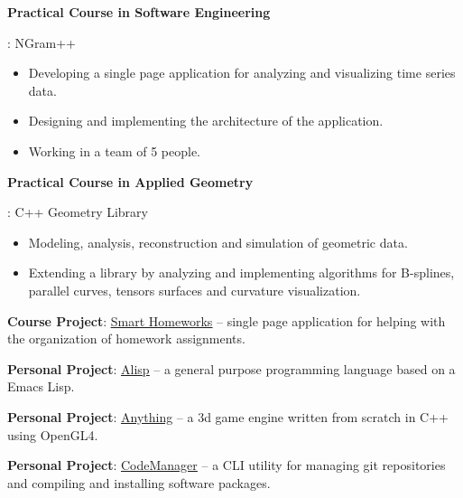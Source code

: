 \documentclass[letterpaper,10pt]{article}
\newcommand{\resumeItem}[2]{
\item\small{
    \textbf{#1}{: #2 \vspace{-2pt}}
  }
}
\newcommand{\resumeSubItem}[2]{\resumeItem{#1}{#2}\vspace{-4pt}}
\begin{document}
\resumeSubItem{Practical Course in Software Engineering}
{NGram++
  \vspace{-5pt}
  \begin{itemize}
  \item Developing a single page application for analyzing and visualizing time series data.
  \item Designing and implementing the architecture of the application.
  \item Working in a team of 5 people.
  \end{itemize}
}

\resumeSubItem{Practical Course in Applied Geometry}
{C++ Geometry Library
  \vspace{-5pt}
  \begin{itemize}
  \item Modeling, analysis, reconstruction and simulation of geometric data.
  \item Extending a library by analyzing and implementing algorithms for B-splines, parallel curves, tensors surfaces and curvature visualization.
  \end{itemize}
}

\resumeSubItem{Course Project}
{\href{https://github.com/palikar/HomeworksSmart/}{\color{blue}\underline{Smart Homeworks}} -- single page application for helping with the organization of homework assignments.\@
}

\resumeSubItem{Personal Project}
{\href{https://github.com/palikar/alisp}{\color{blue}\underline{Alisp}} -- a general purpose programming language based on a Emacs Lisp.
}

\resumeSubItem{Personal Project}
{\href{https://github.com/palikar/anything}{\color{blue}\underline{Anything}} -- a 3d game engine written from scratch in C++ using OpenGL4.
}

\resumeSubItem{Personal Project}
{\href{https://github.com/palikar/code_manager}{\color{blue}\underline{CodeManager}} -- a CLI utility for managing git repositories and compiling and installing software packages.
}
\end{document}

